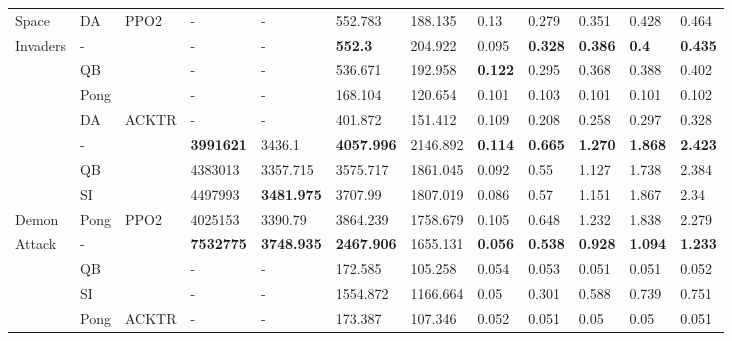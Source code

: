 \begin{table}[]
\begin{tabular}{p{1.3cm}p{1cm}p{0.9cm}p{1cm}p{1.3cm}p{1.2cm}p{1.2cm}p{0.7cm}p{0.7cm}p{0.7cm}p{0.7cm}p{0.7cm}}
		\rowcolor[HTML]{EFEFEF} 
		Space & DA & \multirow{-4}{*}{\cellcolor[HTML]{EFEFEF}PPO2} & - & - & 552.783 & 188.135 & 0.13 & 0.279 & 0.351 & 0.428 & 0.464 \\
		\rowcolor[HTML]{C0C0C0} 
		\cellcolor[HTML]{EFEFEF}Invaders & - & \cellcolor[HTML]{C0C0C0} & - & - & \textbf{552.3} & 204.922 & 0.095 & \textbf{0.328} & \textbf{0.386} & \textbf{0.4} & \textbf{0.435} \\
		\rowcolor[HTML]{C0C0C0} 
		\cellcolor[HTML]{EFEFEF} & QB & \cellcolor[HTML]{C0C0C0} & - & - & 536.671 & 192.958 & \textbf{0.122} & 0.295 & 0.368 & 0.388 & 0.402 \\
		\rowcolor[HTML]{C0C0C0} 
		\cellcolor[HTML]{EFEFEF} & Pong & \cellcolor[HTML]{C0C0C0} & - & - & 168.104 & 120.654 & 0.101 & 0.103 & 0.101 & 0.101 & 0.102 \\
		\rowcolor[HTML]{C0C0C0} 
		\cellcolor[HTML]{EFEFEF} & DA & \multirow{-4}{*}{\cellcolor[HTML]{C0C0C0}ACKTR} & - & - & 401.872 & 151.412 & 0.109 & 0.208 & 0.258 & 0.297 & 0.328 \\
		\rowcolor[HTML]{EFEFEF} 
		\cellcolor[HTML]{C0C0C0} & - & \cellcolor[HTML]{EFEFEF} & \textbf{3991621} & 3436.1 & \textbf{4057.996} & 2146.892 & \textbf{0.114} & \textbf{0.665} & \textbf{1.270} & \textbf{1.868} & \textbf{2.423} \\
		\rowcolor[HTML]{EFEFEF} 
		\cellcolor[HTML]{C0C0C0} & QB & \cellcolor[HTML]{EFEFEF} & 4383013 & 3357.715 & 3575.717 & 1861.045 & 0.092 & 0.55 & 1.127 & 1.738 & 2.384 \\
		\rowcolor[HTML]{EFEFEF} 
		\cellcolor[HTML]{C0C0C0} & SI & \cellcolor[HTML]{EFEFEF} & 4497993 & \textbf{3481.975} & 3707.99 & 1807.019 & 0.086 & 0.57 & 1.151 & 1.867 & 2.34 \\
		\rowcolor[HTML]{EFEFEF} 
		\cellcolor[HTML]{C0C0C0}Demon & Pong & \multirow{-4}{*}{\cellcolor[HTML]{EFEFEF}PPO2} & 4025153 & 3390.79 & 3864.239 & 1758.679 & 0.105 & 0.648 & 1.232 & 1.838 & 2.279 \\
		\rowcolor[HTML]{C0C0C0} 
		Attack & - & \cellcolor[HTML]{C0C0C0} & \textbf{7532775} & \textbf{3748.935} & \textbf{2467.906} & 1655.131 & \textbf{0.056} & \textbf{0.538} & \textbf{0.928} & \textbf{1.094} & \textbf{1.233} \\
		\rowcolor[HTML]{C0C0C0} 
		& QB & \cellcolor[HTML]{C0C0C0} & - & - & 172.585 & 105.258 & 0.054 & 0.053 & 0.051 & 0.051 & 0.052 \\
		\rowcolor[HTML]{C0C0C0} 
		& SI & \cellcolor[HTML]{C0C0C0} & - & - & 1554.872 & 1166.664 & 0.05 & 0.301 & 0.588 & 0.739 & 0.751 \\
		\rowcolor[HTML]{C0C0C0} 
		& Pong & \multirow{-4}{*}{\cellcolor[HTML]{C0C0C0}ACKTR} & - & - & 173.387 & 107.346 & 0.052 & 0.051 & 0.05 & 0.05 & 0.051 \\
		\hline
	\end{tabular}


\end{table}
